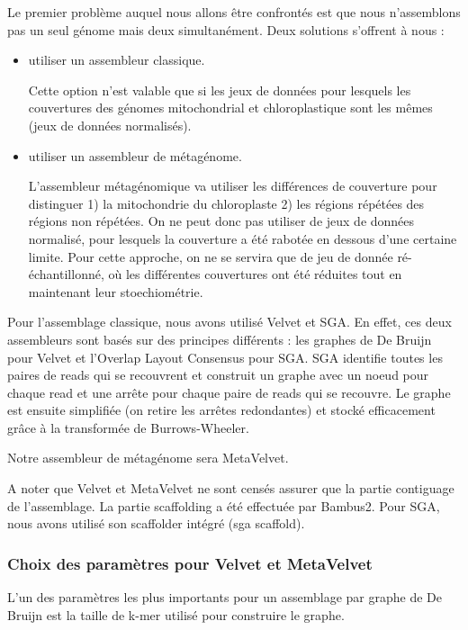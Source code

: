 \documentclass[a4paper]{article}
\begin{document}
Le premier problème auquel nous allons être confrontés est que nous n'assemblons pas un seul génome mais deux simultanément. Deux solutions s'offrent à nous : 
\begin{itemize}
\item utiliser un assembleur classique.

	Cette option n'est valable que si les jeux de données pour lesquels les couvertures des génomes mitochondrial et chloroplastique sont les mêmes (jeux de données normalisés). 

\item utiliser un assembleur de métagénome.

L'assembleur métagénomique va utiliser les différences de couverture pour distinguer 1) la mitochondrie du chloroplaste 2) les régions répétées des régions non répétées. On ne peut donc pas utiliser de jeux de données normalisé, pour lesquels la couverture a été rabotée en dessous d'une certaine limite. Pour cette approche, on ne se servira que de jeu de donnée ré-échantillonné, où les différentes couvertures ont été réduites tout en maintenant leur stoechiométrie.  

\end{itemize}

Pour l'assemblage classique, nous avons utilisé Velvet et SGA. En effet, ces deux assembleurs sont basés sur des principes différents : les graphes de De Bruijn pour Velvet et l'Overlap Layout Consensus pour SGA. SGA identifie toutes les paires de reads qui se recouvrent et construit un graphe avec un noeud pour chaque read et une arrête pour chaque paire de reads qui se recouvre. Le graphe est ensuite simplifiée (on retire les arrêtes redondantes) et stocké efficacement grâce à la transformée de Burrows-Wheeler. \cite{simpson2012efficient}

Notre assembleur de métagénome sera MetaVelvet. 

A noter que Velvet et MetaVelvet ne sont censés assurer que la partie contiguage de l'assemblage. La partie scaffolding a été effectuée par Bambus2. Pour SGA, nous avons utilisé son scaffolder intégré (sga scaffold). 

\subsubsection{Choix des paramètres pour Velvet et MetaVelvet}

L'un des paramètres les plus importants pour un assemblage par graphe de De Bruijn est la taille de k-mer utilisé pour construire le graphe. 
\end{document}

